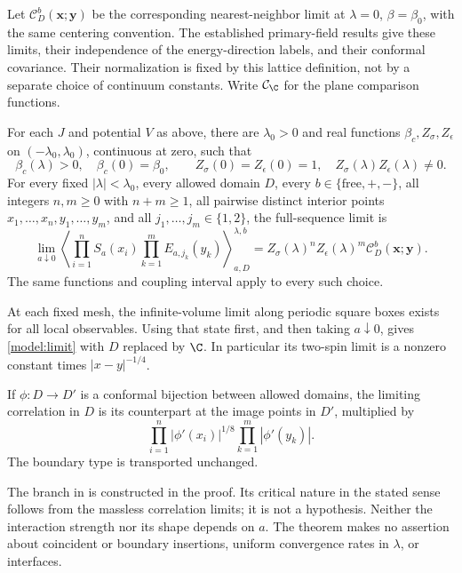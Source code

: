 Let $\mathcal C_D^b(\boldsymbol x;\boldsymbol y)$ be the corresponding
nearest-neighbor limit at $\lambda=0$, $\beta=\beta_0$, with the same
centering convention. The established primary-field results give these
limits, their independence of the energy-direction labels, and their
conformal covariance. Their normalization is fixed by this lattice
definition, not by a separate choice of continuum constants. Write
$\mathcal C_{\C}$ for the plane comparison functions.

\begin{theorem}\label{model:main}
For each $J$ and potential $V$ as above, there are $\lambda_0>0$ and real
functions $\beta_c,Z_\sigma,Z_\epsilon$ on $(-\lambda_0,\lambda_0)$,
continuous at zero, such that
\[
 \beta_c(\lambda)>0,\quad \beta_c(0)=\beta_0,\qquad
 Z_\sigma(0)=Z_\epsilon(0)=1,\quad
 Z_\sigma(\lambda)Z_\epsilon(\lambda)\ne0.
\]
For every fixed $|\lambda|<\lambda_0$, every allowed domain $D$, every
$b\in\{\mathrm{free},+,-\}$, all integers $n,m\ge0$ with $n+m\ge1$,
all pairwise distinct interior points $x_1,\ldots,x_n,y_1,\ldots,y_m$,
and all $j_1,\ldots,j_m\in\{1,2\}$, the full-sequence limit is
\begin{equation}\label{model:limit}
 \lim_{a\downarrow0}
 \left\langle\prod_{i=1}^n S_a(x_i)
                    \prod_{k=1}^m E_{a,j_k}(y_k)\right\rangle_{a,D}^{\lambda,b}
 =Z_\sigma(\lambda)^nZ_\epsilon(\lambda)^m
       \mathcal C_D^b(\boldsymbol x;\boldsymbol y).
\end{equation}
The same functions and coupling interval apply to every such choice.

At each fixed mesh, the infinite-volume limit along periodic square boxes
exists for all local observables. Using that state first, and then taking
$a\downarrow0$, gives \eqref{model:limit} with $D$ replaced by $\C$.
In particular its two-spin limit is a nonzero constant times
$|x-y|^{-1/4}$.

If $\phi:D\to D'$ is a conformal bijection between allowed domains, the
limiting correlation in $D$ is its counterpart at the image points in
$D'$, multiplied by
\begin{equation}\label{model:covariance}
 \prod_{i=1}^n|\phi'(x_i)|^{1/8}
 \prod_{k=1}^m|\phi'(y_k)|.
\end{equation}
The boundary type is transported unchanged.
\end{theorem}

The branch in  is constructed in the proof. Its critical
nature in the stated sense follows from the massless correlation limits;
it is not a hypothesis. Neither the interaction strength nor its shape
depends on $a$. The theorem makes no assertion about coincident or boundary
insertions, uniform convergence rates in $\lambda$, or interfaces.
